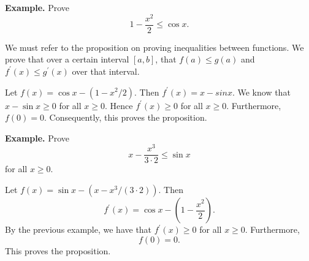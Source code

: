 \textbf{Example.} Prove
\[1 - \frac{x^2}{2} \le \cos x.\]

We must refer to the proposition on proving inequalities between functions. We prove that over a certain interval $[a,b]$, that $f(a) \le g(a)$ and $f^\prime(x) \le g^\prime(x)$ over that interval.

Let $f(x) = \cos x - (1 - x^2/2)$. Then $f^\prime(x) = x - sin x$. We know that $x - \sin x \ge 0$ for all $x \ge 0$. Hence $f^\prime(x) \ge 0$ for all $x \ge 0$. Furthermore, $f(0) = 0$. Consequently, this proves the proposition.

\textbf{Example.} Prove
\[x - \frac{x^3}{3 \cdot 2} \le \sin x\]
for all $x \ge 0$.

Let $f(x) = \sin x - (x - x^3/(3 \cdot 2))$. Then
\[f^\prime(x) = \cos x - (1 - \frac{x^2}{2}).\]
By the previous example, we have that $f^\prime(x) \ge 0$ for all $x \ge 0$. Furthermore,
\[f(0) = 0.\]
This proves the proposition.

